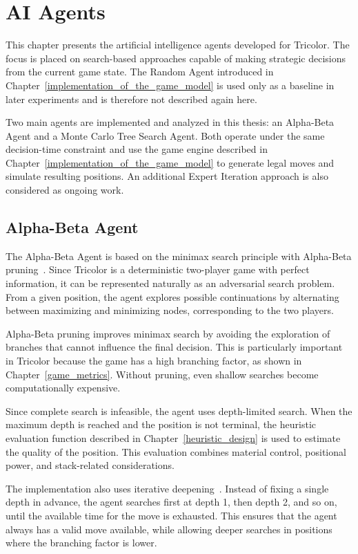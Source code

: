 \chapter{AI Agents}
\label{advanced_ai_agents}

This chapter presents the artificial intelligence agents developed for Tricolor. The focus is placed on search-based approaches capable of making strategic decisions from the current game state. The Random Agent introduced in Chapter~\ref{implementation_of_the_game_model} is used only as a baseline in later experiments and is therefore not described again here.

Two main agents are implemented and analyzed in this thesis: an Alpha-Beta Agent and a Monte Carlo Tree Search Agent. Both operate under the same decision-time constraint and use the game engine described in Chapter~\ref{implementation_of_the_game_model} to generate legal moves and simulate resulting positions. An additional Expert Iteration approach is also considered as ongoing work.

\section{Alpha-Beta Agent}

The Alpha-Beta Agent is based on the minimax search principle with Alpha-Beta pruning~\cite{russell2010aima}. Since Tricolor is a deterministic two-player game with perfect information, it can be represented naturally as an adversarial search problem. From a given position, the agent explores possible continuations by alternating between maximizing and minimizing nodes, corresponding to the two players.

Alpha-Beta pruning improves minimax search by avoiding the exploration of branches that cannot influence the final decision. This is particularly important in Tricolor because the game has a high branching factor, as shown in Chapter~\ref{game_metrics}. Without pruning, even shallow searches become computationally expensive.

Since complete search is infeasible, the agent uses depth-limited search. When the maximum depth is reached and the position is not terminal, the heuristic evaluation function described in Chapter~\ref{heuristic_design} is used to estimate the quality of the position. This evaluation combines material control, positional power, and stack-related considerations.

The implementation also uses iterative deepening~\cite{russell2010aima}. Instead of fixing a single depth in advance, the agent searches first at depth 1, then depth 2, and so on, until the available time for the move is exhausted. This ensures that the agent always has a valid move available, while allowing deeper searches in positions where the branching factor is lower.


